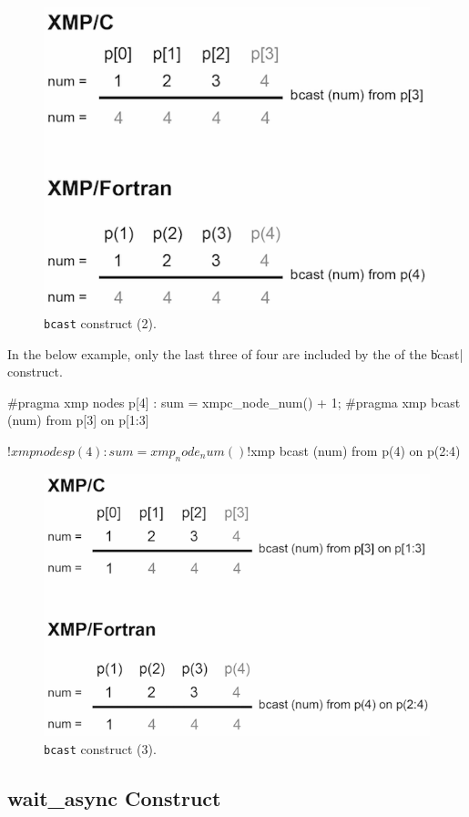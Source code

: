 \begin{figure}
  \centering
  \includegraphics[width=0.7\columnwidth]{figs/bcast_from.png}
  \caption{{\tt bcast} construct (2).}
\end{figure}

In the below example, only the last three of four {\nodes}
are included by the {\enset} of the \|bcast| construct.

\begin{XCexample}
#pragma xmp nodes p[4]
  :
sum = xmpc_node_num() + 1;
#pragma xmp bcast (num) from p[3] on p[1:3]
\end{XCexample}

\begin{XFexample}
!$xmp nodes p(4)
  :
 sum = xmp_node_num()
 !$xmp bcast (num) from p(4) on p(2:4)
\end{XFexample}

\begin{figure}
  \centering
  \includegraphics[width=0.7\columnwidth]{figs/bcast_from_on.png}
  \caption{{\tt bcast} construct (3).}
\end{figure}


\subsection{{\bf wait\_async} Construct}


